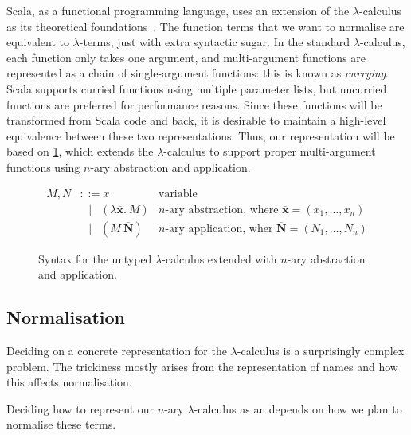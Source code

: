 \documentclass[../../main.tex]{subfiles}
\begin{document}
Scala, as a functional programming language, uses an extension of the $\lambda$-calculus~\cite{church_lambda_1936} as its theoretical foundations~\cite{cremet_core_2006,amin_essence_2016}.
The function terms that we want to normalise are equivalent to $\lambda$-terms, just with extra syntactic sugar.
In the standard $\lambda$-calculus, each function only takes one argument, and multi-argument functions are represented as a chain of single-argument functions: this is known as \emph{currying}.
Scala supports curried functions using multiple parameter lists, but uncurried functions are preferred for performance reasons.
Since these functions will be transformed from Scala code and back, it is desirable to maintain a high-level equivalence between these two representations.
Thus, our representation will be based on \cref{fig:lambda-calculus}, which extends the $\lambda$-calculus to support proper multi-argument functions using $n$-ary abstraction and application.

\begin{figure}
\begin{align*}
M, N &\mathrel{::=} x & \text{variable} \\
&\mathrel{\enspace\mid\enspace} (\lambda \overline{\mathbf{x}}.\ M) & \text{$n$-ary abstraction, where } \overline{\mathbf{x}} = (x_1, \ldots, x_n) \\
&\mathrel{\enspace\mid\enspace} (M\ \overline{\mathbf{N}}) & \text{$n$-ary application, wher } \overline{\mathbf{N}} = (N_1, \ldots, N_n)
\end{align*}
\caption{Syntax for the untyped $\lambda$-calculus extended with $n$-ary abstraction and application.}
\label{fig:lambda-calculus}
\end{figure}

\subsection{Normalisation}\label{sec:normalisation-approach}
Deciding on a concrete  representation for the $\lambda$-calculus is a surprisingly complex problem.
The trickiness mostly arises from the representation of names and how this affects normalisation.


Deciding how to represent our $n$-ary $\lambda$-calculus as an  depends on how we plan to normalise these terms.
\end{document}
